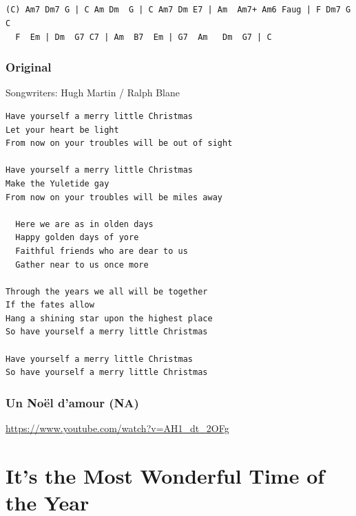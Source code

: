 \documentclass[
]{article}
\begin{document}
\hypertarget{section-17}{%
\subsection*{}\label{section-17}}

\begin{verbatim}
(C) Am7 Dm7 G | C Am Dm  G | C Am7 Dm E7 | Am  Am7+ Am6 Faug | F Dm7 G C
  F  Em | Dm  G7 C7 | Am  B7  Em | G7  Am   Dm  G7 | C
\end{verbatim}

\hypertarget{original-3}{%
\subsubsection*{Original}\label{original-3}}

Songwriters: Hugh Martin / Ralph Blane

\begin{verbatim}
Have yourself a merry little Christmas
Let your heart be light
From now on your troubles will be out of sight

Have yourself a merry little Christmas
Make the Yuletide gay
From now on your troubles will be miles away

  Here we are as in olden days
  Happy golden days of yore
  Faithful friends who are dear to us
  Gather near to us once more

Through the years we all will be together
If the fates allow
Hang a shining star upon the highest place
So have yourself a merry little Christmas

Have yourself a merry little Christmas
So have yourself a merry little Christmas
\end{verbatim}

\hypertarget{un-nouxebl-damour-na}{%
\subsubsection*{Un Noël d'amour (NA)}\label{un-nouxebl-damour-na}}

\url{https://www.youtube.com/watch?v=AH1_dt_2OFg}

\hypertarget{its-the-most-wonderful-time-of-the-year}{%
\section{It's the Most Wonderful Time of the
Year}\label{its-the-most-wonderful-time-of-the-year}}
\end{document}
